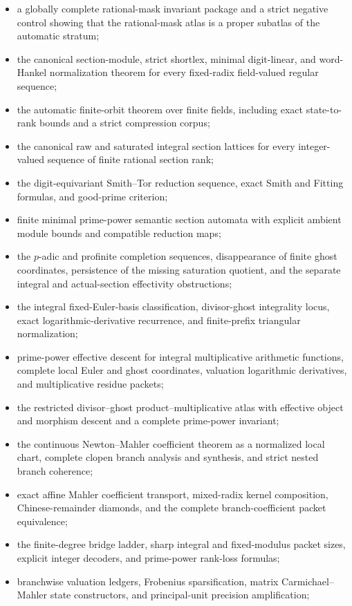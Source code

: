 \begin{itemize}
\item a globally complete rational-mask invariant package and a strict negative control showing that the rational-mask atlas is a proper subatlas of the automatic stratum;
\item the canonical section-module, strict shortlex, minimal digit-linear, and word-Hankel normalization theorem for every fixed-radix field-valued regular sequence;
\item the automatic finite-orbit theorem over finite fields, including exact state-to-rank bounds and a strict compression corpus;
\item the canonical raw and saturated integral section lattices for every integer-valued sequence of finite rational section rank;
\item the digit-equivariant Smith--Tor reduction sequence, exact Smith and Fitting formulas, and good-prime criterion;
\item finite minimal prime-power semantic section automata with explicit ambient module bounds and compatible reduction maps;
\item the \(p\)-adic and profinite completion sequences, disappearance of finite ghost coordinates, persistence of the missing saturation quotient, and the separate integral and actual-section effectivity obstructions;
\item the integral fixed-Euler-basis classification, divisor-ghost integrality locus, exact logarithmic-derivative recurrence, and finite-prefix triangular normalization;
\item prime-power effective descent for integral multiplicative arithmetic functions, complete local Euler and ghost coordinates, valuation logarithmic derivatives, and multiplicative residue packets;
\item the restricted divisor--ghost product--multiplicative atlas with effective object and morphism descent and a complete prime-power invariant;
\item the continuous Newton--Mahler coefficient theorem as a normalized local chart, complete clopen branch analysis and synthesis, and strict nested branch coherence;
\item exact affine Mahler coefficient transport, mixed-radix kernel composition, Chinese-remainder diamonds, and the complete branch-coefficient packet equivalence;
\item the finite-degree bridge ladder, sharp integral and fixed-modulus packet sizes, explicit integer decoders, and prime-power rank-loss formulas;
\item branchwise valuation ledgers, Frobenius sparsification, matrix Carmichael--Mahler state constructors, and principal-unit precision amplification;

\end{itemize}
